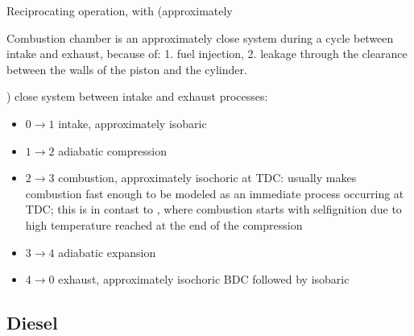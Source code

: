 \documentclass[letterpaper,10pt,english]{jupyterBook}
\begin{document}
\sphinxAtStartPar
{} Reciprocating operation, with (approximately%
\begin{footnote}[1]\sphinxAtStartFootnote
Combustion chamber is an approximately close system during a cycle between intake and exhaust, because of: 1. fuel injection, 2. leakage through the clearance between the walls of the piston and the cylinder.
%
\end{footnote}) close system between intake and exhaust processes:
\begin{itemize}
\item {} 
\sphinxAtStartPar
\(0 \rightarrow 1\) intake, approximately isobaric

\item {} 
\sphinxAtStartPar
\(1 \rightarrow 2\) adiabatic compression

\item {} 
\sphinxAtStartPar
\(2 \rightarrow 3\) combustion, approximately isochoric at TDC:  usually makes combustion fast enough to be modeled as an immediate process occurring at TDC; this is in contast to {\hyperref[\detokenize{ch/heat-engines:classical-thermodynamics-heat-engines-real-diesel}]{}}, where combustion starts with self\sphinxhyphen{}ignition due to high temperature reached at the end of the compression

\item {} 
\sphinxAtStartPar
\(3 \rightarrow 4\) adiabatic expansion

\item {} 
\sphinxAtStartPar
\(4 \rightarrow 0\) exhaust, approximately isochoric BDC followed by isobaric

\end{itemize}


\subsection{Diesel}
\label{\detokenize{ch/heat-engines:diesel}}\label{\detokenize{ch/heat-engines:classical-thermodynamics-heat-engines-real-diesel}}
\sphinxAtStartPar
{}

\sphinxAtStartPar
{}
\end{document}
